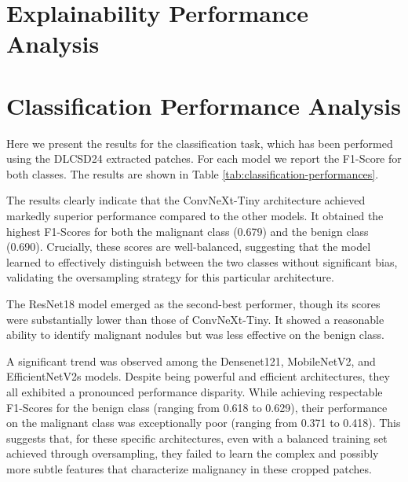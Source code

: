 \section{Explainability Performance Analysis}


\section{Classification Performance Analysis}
Here we present the results for the classification task, which has been performed using the DLCSD24 extracted patches. For each model we report the F1-Score for both classes. The results are shown in Table \ref{tab:classification-performances}.



The results clearly indicate that the ConvNeXt-Tiny architecture achieved markedly superior performance compared to the other models. It obtained the highest F1-Scores for both the malignant class (0.679) and the benign class (0.690). Crucially, these scores are well-balanced, suggesting that the model learned to effectively distinguish between the two classes without significant bias, validating the oversampling strategy for this particular architecture.

The ResNet18 model emerged as the second-best performer, though its scores were substantially lower than those of ConvNeXt-Tiny. It showed a reasonable ability to identify malignant nodules but was less effective on the benign class.

A significant trend was observed among the Densenet121, MobileNetV2, and EfficientNetV2s models. Despite being powerful and efficient architectures, they all exhibited a pronounced performance disparity. While achieving respectable F1-Scores for the benign class (ranging from 0.618 to 0.629), their performance on the malignant class was exceptionally poor (ranging from 0.371 to 0.418). This suggests that, for these specific architectures, even with a balanced training set achieved through oversampling, they failed to learn the complex and possibly more subtle features that characterize malignancy in these cropped patches.

